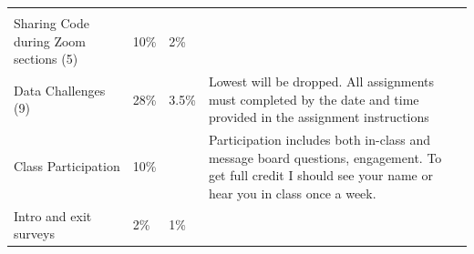 \documentclass[
]{book}
\begin{document}
\begin{longtable}[]{@{}llll@{}}
\begin{minipage}[t]{0.22\columnwidth}
\strut
\end{minipage}\tabularnewline
\begin{minipage}[t]{0.22\columnwidth}\raggedright
Sharing Code during Zoom sections (5)\strut
\end{minipage} & \begin{minipage}[t]{0.22\columnwidth}\raggedright
10\%\strut
\end{minipage} & \begin{minipage}[t]{0.22\columnwidth}\raggedright
2\%\strut
\end{minipage} & \begin{minipage}[t]{0.22\columnwidth}\raggedright
\strut
\end{minipage}\tabularnewline
\begin{minipage}[t]{0.22\columnwidth}\raggedright
Data Challenges (9)\strut
\end{minipage} & \begin{minipage}[t]{0.22\columnwidth}\raggedright
28\%\strut
\end{minipage} & \begin{minipage}[t]{0.22\columnwidth}\raggedright
3.5\%\strut
\end{minipage} & \begin{minipage}[t]{0.22\columnwidth}\raggedright
Lowest will be dropped. All assignments must completed by the date and time provided in the assignment instructions\strut
\end{minipage}\tabularnewline
\begin{minipage}[t]{0.22\columnwidth}\raggedright
Class Participation\strut
\end{minipage} & \begin{minipage}[t]{0.22\columnwidth}\raggedright
10\%\strut
\end{minipage} & \begin{minipage}[t]{0.22\columnwidth}\raggedright
\strut
\end{minipage} & \begin{minipage}[t]{0.22\columnwidth}\raggedright
Participation includes both in-class and message board questions, engagement. To get full credit I should see your name or hear you in class once a week.\strut
\end{minipage}\tabularnewline
\begin{minipage}[t]{0.22\columnwidth}\raggedright
Intro and exit surveys\strut
\end{minipage} & \begin{minipage}[t]{0.22\columnwidth}\raggedright
2\%\strut
\end{minipage} & \begin{minipage}[t]{0.22\columnwidth}\raggedright
1\%\strut
\end{minipage} & \begin{minipage}[t]{0.22\columnwidth}\raggedright
\strut
\end{minipage}\tabularnewline
\bottomrule
\end{longtable}
\end{document}
